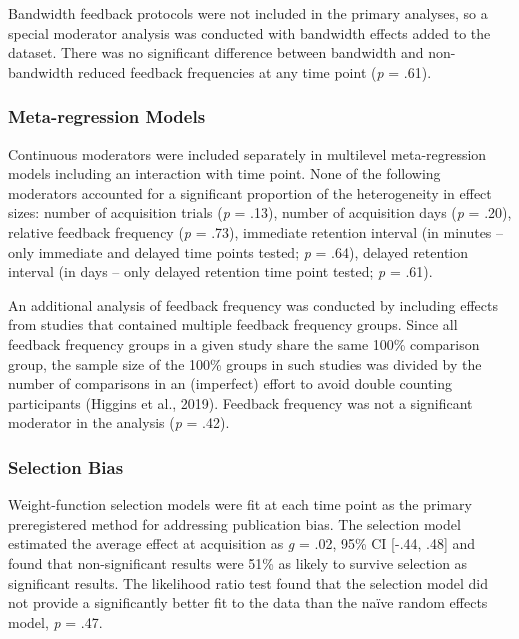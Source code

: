 \documentclass[
  english,
  man, donotrepeattitle,floatsintext]{apa7}
\begin{document}
Bandwidth feedback protocols were not included in the primary analyses, so a special moderator analysis was conducted with bandwidth effects added to the dataset. There was no significant difference between bandwidth and non-bandwidth reduced feedback frequencies at any time point (\emph{p} = .61).

\hypertarget{meta-regression-models}{%
\subsubsection{Meta-regression Models}\label{meta-regression-models}}

Continuous moderators were included separately in multilevel meta-regression models including an interaction with time point. None of the following moderators accounted for a significant proportion of the heterogeneity in effect sizes: number of acquisition trials (\emph{p} = .13), number of acquisition days (\emph{p} = .20), relative feedback frequency (\emph{p} = .73), immediate retention interval (in minutes -- only immediate and delayed time points tested; \emph{p} = .64), delayed retention interval (in days -- only delayed retention time point tested; \emph{p} = .61).

An additional analysis of feedback frequency was conducted by including effects from studies that contained multiple feedback frequency groups. Since all feedback frequency groups in a given study share the same 100\% comparison group, the sample size of the 100\% groups in such studies was divided by the number of comparisons in an (imperfect) effort to avoid double counting participants (Higgins et al., 2019). Feedback frequency was not a significant moderator in the analysis (\emph{p} = .42).

\hypertarget{selection-bias}{%
\subsubsection{Selection Bias}\label{selection-bias}}

Weight-function selection models were fit at each time point as the primary preregistered method for addressing publication bias. The selection model estimated the average effect at acquisition as \emph{g} = .02, 95\% CI {[}-.44, .48{]} and found that non-significant results were 51\% as likely to survive selection as significant results. The likelihood ratio test found that the selection model did not provide a significantly better fit to the data than the naïve random effects model, \emph{p} = .47.
\end{document}
